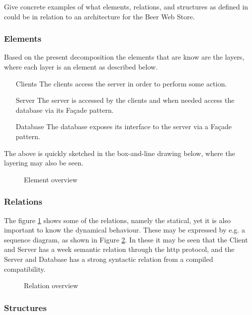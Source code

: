 \begin{question}
Give concrete examples of what elements, relations, and structures as defined in \cite{bass2003sa} could be in relation to an architecture for the Beer Web Store.
\end{question}

\subsubsection{Elements}
Based on the present decomposition the elements that are know are the layers, where each layer is an element as described below.
\begin{itemize}
    \item[Clients] The clients access the server in order to perform some action.
    \item[Server] The server is accessed by the clients and when needed access the database via its Fa\c cade pattern.
    \item[Database] The database exposes its interface to the server via a Fa\c cade pattern.
\end{itemize}
The above is quickly sketched in the box-and-line drawing below, where the layering may also be seen. 
\begin{figure}[!htb]
\centerline{}
\caption{Element overview}
\label{fig:module_view}
\end{figure}
\clearpage

\subsubsection{Relations}
The figure \ref{fig:module_view} shows some of the relations, namely the statical, yet it is also important to know the dynamical behaviour. These may be expressed by e.g. a sequence diagram, as shown in Figure \ref{fig:sequence}. In these it may be seen that the Client and Server has a week semantic relation through the http protocol, and the Server and Database has a strong syntactic relation from a compiled compatibility. 

\begin{figure}[!htb]
\centerline{}
\caption{Relation overview}
\label{fig:sequence}
\end{figure}

\subsubsection{Structures}

